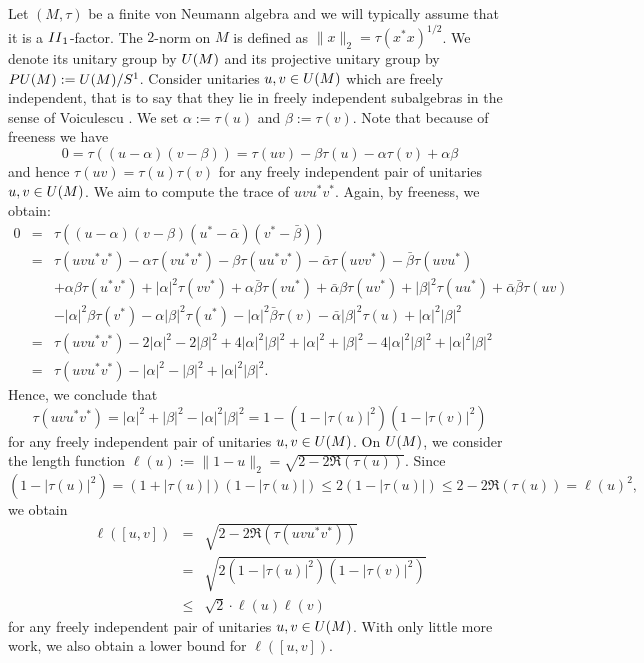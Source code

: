 \documentclass[11pt]{amsproc}
\theoremstyle{plain}
\theoremstyle{remark}
\begin{document}
Let $(M,\tau)$ be a finite von Neumann algebra and we will typically assume that it is a ${\rm II}_1$-factor. The $2$-norm on $M$ is defined as $\|x\|_2 = \tau(x^*x)^{1/2}$. We denote its unitary group by ${\rm U}(M)$ and its projective unitary group by ${\rm PU}(M):={\rm U}(M)/S^1$. Consider unitaries $u,v \in {\rm U}(M)$ which are  freely independent, that is to say that they lie in  freely independent subalgebras in the sense of Voiculescu \cite{MR1217253}. We set $\alpha := \tau(u)$ and $\beta := \tau(v)$. Note that because of freeness we have
$$0 = \tau((u-\alpha)(v-\beta)) = \tau(uv) - \beta \tau(u) - \alpha \tau(v) + \alpha \beta$$
and hence $\tau(uv) = \tau(u)\tau(v)$ for any  freely independent pair of unitaries $u,v \in {\rm U}(M)$. We aim to compute the trace of $uvu^*v^*$. Again, by freeness, we obtain:
\begin{eqnarray*}
0 &=& \tau((u-\alpha)(v-\beta)(u^* - \bar \alpha)(v^* - \bar \beta)) \\
&=& \tau(uvu^*v^*)  - \alpha \tau(vu^*v^*) - \beta \tau(uu^*v^*) - \bar \alpha \tau(uvv^*) - \bar \beta \tau(uvu^*) \\
&& + \alpha \beta \tau(u^*v^*) + |\alpha|^2 \tau(vv^*) + \alpha \bar \beta \tau(vu^*)  + \bar \alpha \beta \tau(uv^*) + |\beta|^2 \tau(uu^*) + \bar \alpha \bar \beta \tau(uv) \\
&& - |\alpha|^2 \beta \tau(v^*) - \alpha |\beta|^2 \tau(u^*) - |\alpha|^2 \bar \beta \tau(v) - \bar \alpha |\beta|^2 \tau(u)  + |\alpha|^2|\beta|^2 \\
&=&  \tau(uvu^*v^*) - 2|\alpha|^2 - 2 |\beta|^2  + 4 |\alpha|^2  |\beta|^2 + |\alpha|^2 + |\beta|^2  - 4 |\alpha|^2  |\beta|^2 + |\alpha|^2  |\beta|^2 \\
&=& \tau(uvu^*v^*) - |\alpha|^2  - |\beta|^2 + |\alpha|^2  |\beta|^2.
\end{eqnarray*}
Hence, we conclude that $$\tau(uvu^*v^*) = |\alpha|^2  + |\beta|^2 - |\alpha|^2  |\beta|^2 = 1 - (1-|\tau(u)|^2)(1-|\tau(v)|^2)$$ for any  freely independent pair of unitaries $u,v \in {\rm U}(M)$. 
On ${\rm U}(M)$, we consider the length function $\ell(u):= \|1-u\|_2 = \sqrt{2-2 \Re(\tau(u))}$.
Since
$$(1-|\tau(u)|^2) = (1+ |\tau(u)|)(1-|\tau(u)|) \leq 2 (1-|\tau(u)|) \leq 2 - 2\Re(\tau(u)) = \ell(u)^2,$$we obtain
\begin{eqnarray*}
\ell([u,v]) &=& \sqrt{2-2 \Re(\tau(uvu^*v^*))} \\
&=& \sqrt{2(1-|\tau(u)|^2)(1- |\tau(v)|^2)} \\
&\leq&\sqrt{2} \cdot \ell(u) \ell(v)
\end{eqnarray*} for any  freely independent pair of unitaries $u,v \in {\rm U}(M)$. With only little more work, we also obtain a lower bound for $\ell([u,v])$.
\end{document}

